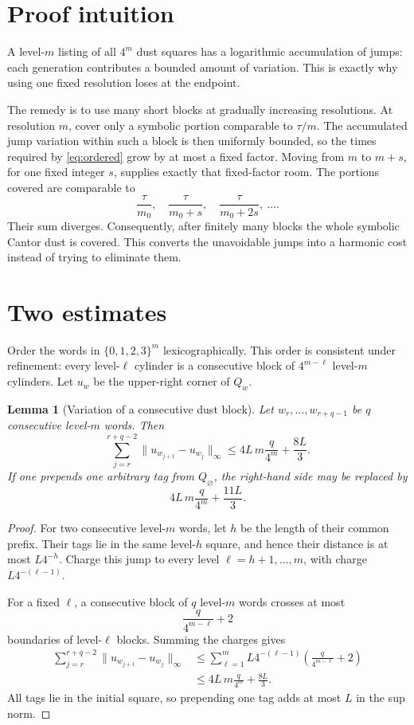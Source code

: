 \documentclass[11pt]{article}
\newtheorem{lemma}[theorem]{Lemma}
\begin{document}
\section*{Proof intuition}

A level-\(m\) listing of all \(4^m\) dust squares has a logarithmic
accumulation of jumps: each generation contributes a bounded amount of
variation.  This is exactly why using one fixed resolution loses at the
endpoint.

The remedy is to use many short blocks at gradually increasing resolutions.
At resolution \(m\), cover only a symbolic portion comparable to
\(\tau/m\).  The accumulated jump variation within such a block is then
uniformly bounded, so the times required by \eqref{eq:ordered} grow by at
most a fixed factor.  Moving from \(m\) to \(m+s\), for one fixed integer
\(s\), supplies exactly that fixed-factor room.  The portions covered are
comparable to
\[
  \frac{\tau}{m_0},\quad
  \frac{\tau}{m_0+s},\quad
  \frac{\tau}{m_0+2s},\ \ldots.
\]
Their sum diverges.  Consequently, after finitely many blocks the whole
symbolic Cantor dust is covered.  This converts the unavoidable jumps into a
harmonic cost instead of trying to eliminate them.

\section*{Two estimates}

Order the words in \(\{0,1,2,3\}^m\) lexicographically.  This order is
consistent under refinement: every level-\(\ell\) cylinder is a consecutive
block of \(4^{m-\ell}\) level-\(m\) cylinders.  Let \(u_w\) be the
upper-right corner of \(Q_w\).

\begin{lemma}[Variation of a consecutive dust block]\label{lem:variation}
Let \(w_r,\ldots,w_{r+q-1}\) be \(q\) consecutive level-\(m\) words.  Then
\[
 \sum_{j=r}^{r+q-2}\|u_{w_{j+1}}-u_{w_j}\|_\infty
 \leq 4L\,m\frac{q}{4^m}+\frac{8L}{3}.
\]
If one prepends one arbitrary tag from \(Q_\varnothing\), the right-hand
side may be replaced by
\[
 4L\,m\frac{q}{4^m}+\frac{11L}{3}.
\]
\end{lemma}

\begin{proof}
For two consecutive level-\(m\) words, let \(h\) be the length of their
common prefix.  Their tags lie in the same level-\(h\) square, and hence
their distance is at most \(L4^{-h}\).  Charge this jump to every level
\(\ell=h+1,\ldots,m\), with charge \(L4^{-(\ell-1)}\).

For a fixed \(\ell\), a consecutive block of \(q\) level-\(m\) words crosses
at most
\[
  \frac{q}{4^{m-\ell}}+2
\]
boundaries of level-\(\ell\) blocks.  Summing the charges gives
\begin{align*}
 \sum_{j=r}^{r+q-2}\|u_{w_{j+1}}-u_{w_j}\|_\infty
 &\leq
 \sum_{\ell=1}^m L4^{-(\ell-1)}
 \left(\frac{q}{4^{m-\ell}}+2\right)\\
 &\leq 4L\,m\frac{q}{4^m}+\frac{8L}{3}.
\end{align*}
All tags lie in the initial square, so prepending one tag adds at most
\(L\) in the sup norm.
\end{proof}
\end{document}
